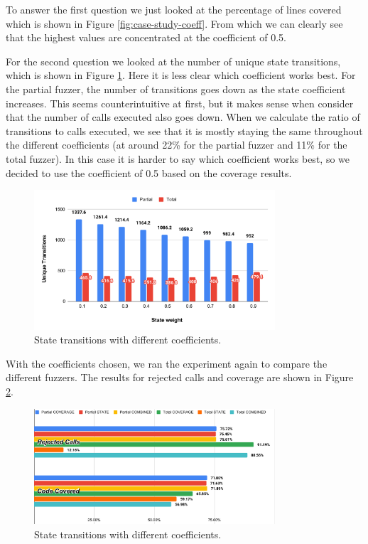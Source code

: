 To answer the first question we just looked at the percentage of lines covered which is shown in Figure \ref{fig:case-study-coeff}.
From which we can clearly see that the highest values are concentrated at the coefficient of 0.5.



For the second question we looked at the number of unique state transitions, which is shown in Figure \ref{fig:coef-trans}.
Here it is less clear which coefficient works best.
For the partial fuzzer, the number of transitions goes down as the state coefficient increases.
This seems counterintuitive at first, but it makes sense when consider that the number of calls executed also goes down.
When we calculate the ratio of transitions to calls executed, we see that it is mostly staying the same throughout the different coefficients (at around 22\% for the partial fuzzer and 11\% for the total fuzzer).
In this case it is harder to say which coefficient works best, so we decided to use the coefficient of 0.5 based on the coverage results.

\begin{figure}[htbp]
    \centering
    \includegraphics[width=0.8\textwidth]{charts/coef-trans-2.pdf}
    \caption{State transitions with different coefficients.}\label{fig:coef-trans}
\end{figure}

With the coefficients chosen, we ran the experiment again to compare the different fuzzers.
The results for rejected calls and coverage are shown in Figure \ref{fig:rej-cov}.

\begin{figure}[htbp]
    \centering
    \includegraphics[width=0.8\textwidth]{charts/rej-cov.pdf}
    \caption{State transitions with different coefficients.}\label{fig:rej-cov}
\end{figure}

